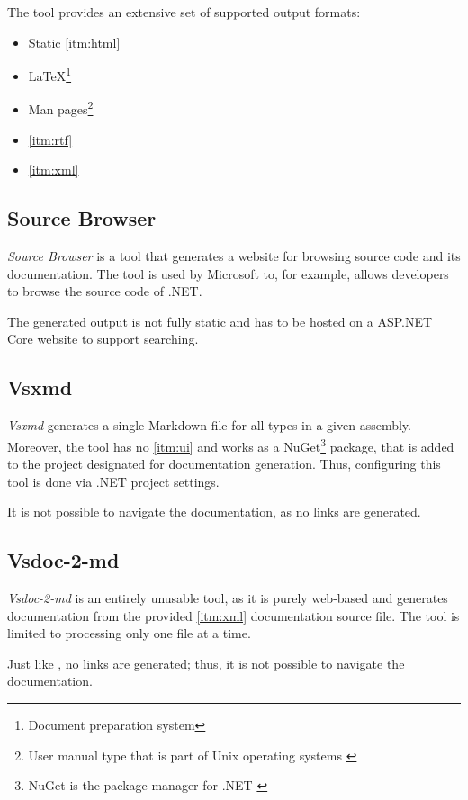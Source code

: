 The tool provides an extensive set of supported output formats:
\begin{itemize}
    \item Static \ref{itm:html}
    \item \LaTeX\footnote{Document preparation system}
    \item Man pages\footnote{User manual type that is part of Unix operating systems \cite{credocs_limited_latex_2022}}
    \item \ref{itm:rtf}
    \item \ref{itm:xml}
\end{itemize}

\subsection{Source Browser}

\textit{Source Browser} is a tool that generates a website for browsing source code and its documentation. The tool is used by Microsoft to, for example, allows developers to browse the source code of .NET.

The generated output is not fully static and has to be hosted on a ASP.NET Core website to support searching.

\subsection{Vsxmd} \label{ssec:vsxmd}

\textit{Vsxmd} generates a single Markdown file for all types in a given assembly. Moreover, the tool has no \ref{itm:ui} and works as a NuGet\footnote{NuGet is the package manager for .NET \cite{microsoft_nuget_nodate}} package, that is added to the project designated for documentation generation. Thus, configuring this tool is done via .NET project settings.

It is not possible to navigate the documentation, as no links are generated.

\subsection{Vsdoc-2-md}

\textit{Vsdoc-2-md} is an entirely unusable tool, as it is purely web-based and generates documentation from the provided \ref{itm:xml} documentation source file. The tool is limited to processing only one file at a time.

Just like \textit{}, no links are generated; thus, it is not possible to navigate the documentation.